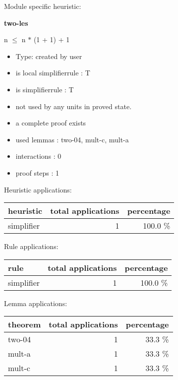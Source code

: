 \documentclass[a4paper]{article}
\begin{document}
Module specific heuristic:

\pagebreak

{\LARGE\bf two-les}\label{lemma-two-les}

\medskip

 \Fol n $\le$ n $*$ (1 + 1) + 1

\begin{itemize}

\item Type: created by user

\item is local simplifierrule : T
\item is simplifierrule : T
\item not used by any units in proved state.
\item       a complete proof exists
\item       used lemmas  : two-04, mult-c, mult-a
\item       interactions : 0
\item       proof steps  : 1
\end{itemize}

\medskip


Heuristic applications:

\begin{supertabular}{l|r|r}
heuristic	& total applications & percentage \\ \hline
simplifier & 1 & 100.0 \% \\

\end{supertabular}

Rule applications:

\begin{supertabular}{l|r|r}
rule	        & total applications & percentage \\ \hline
simplifier & 1 & 100.0 \% \\

\end{supertabular}

Lemma applications:

\begin{supertabular}{l|r|r}
theorem	        & total applications & percentage \\ \hline
two-04 & 1 & 33.3 \% \\
mult-a & 1 & 33.3 \% \\
mult-c & 1 & 33.3 \% \\

\end{supertabular}
\end{document}
